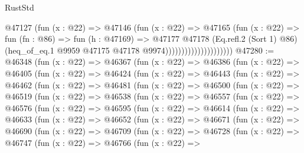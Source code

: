 \begin{lexlean}{RustStd}
\begin{coremodule}
                                    @47127
                                      (fun (x : @22) =>
                                      @47146
                                        (fun (x : @22) =>
                                        @47165
                                          (fun (x : @22) =>
                                          fun (fn : @86) =>
                                          fun (h : @47169) =>
                                          @47177
                                            @47178
                                            (Eq.refl.{2} (Sort 1) @86)
                                            (heq_of_eq.{1}
                                              @9959
                                              @47175
                                              @47178
                                              @9974)))))))))))))))))))))
@47280 := @46348
    (fun (x : @22) =>
    @46367
      (fun (x : @22) =>
      @46386
        (fun (x : @22) =>
        @46405
          (fun (x : @22) =>
          @46424
            (fun (x : @22) =>
            @46443
              (fun (x : @22) =>
              @46462
                (fun (x : @22) =>
                @46481
                  (fun (x : @22) =>
                  @46500
                    (fun (x : @22) =>
                    @46519
                      (fun (x : @22) =>
                      @46538
                        (fun (x : @22) =>
                        @46557
                          (fun (x : @22) =>
                          @46576
                            (fun (x : @22) =>
                            @46595
                              (fun (x : @22) =>
                              @46614
                                (fun (x : @22) =>
                                @46633
                                  (fun (x : @22) =>
                                  @46652
                                    (fun (x : @22) =>
                                    @46671
                                      (fun (x : @22) =>
                                      @46690
                                        (fun (x : @22) =>
                                        @46709
                                          (fun (x : @22) =>
                                          @46728
                                            (fun (x : @22) =>
                                            @46747
                                              (fun (x : @22) =>
                                              @46766
                                                (fun (x : @22) =>

\end{coremodule}
\end{lexlean}
